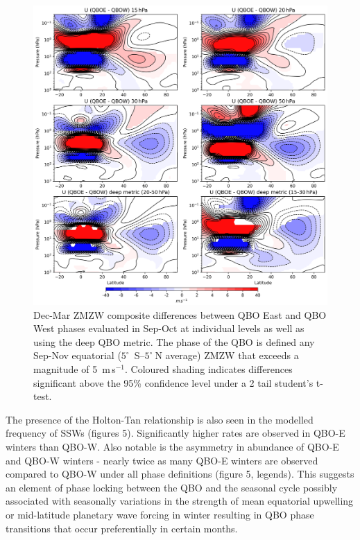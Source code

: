 \begin{figure}[h!]
\begin{center}
\noindent\includegraphics[width = 0.85\linewidth]{Figures/Figures-origins/holton_tan_composites.png}
\caption[ZMZW composite differences between QBO phases in UKESM.]{Dec-Mar ZMZW composite differences between QBO East and QBO West phases evaluated in Sep-Oct at individual levels as well as using the deep QBO metric. The phase of the QBO is defined any Sep-Nov equatorial ($5^{\circ}$\ S--$5^{\circ}\ $N average) ZMZW that exceeds a magnitude of 5\ m\,s$^{-1}$. Coloured shading indicates differences significant above the 95\% confidence level under a 2 tail student’s t-test.}
\label{fig:holton_tan_comp}
\end{center}
\end{figure}

The presence of the Holton-Tan relationship is also seen in the modelled frequency of SSWs (figures 5). Significantly higher rates are observed in QBO-E winters than QBO-W. Also notable is the asymmetry in abundance of QBO-E and QBO-W winters - nearly twice as many QBO-E winters are observed compared to QBO-W under all phase definitions (figure 5, legends). This suggests an element of phase locking between the QBO and the seasonal cycle possibly associated with seasonally variations in the strength of mean equatorial upwelling or mid-latitude planetary wave forcing in winter \citep{pascoeQuasibiennial2005, gruzdevTwo2000, rajendranSynchronisation2016} resulting in QBO phase transitions that occur preferentially in certain months. 

